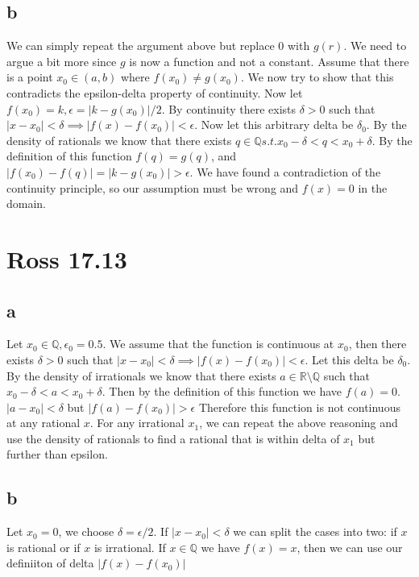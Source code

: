 \documentclass[12pt]{article}
\newcommand{\R}{\mathbb{R}}
\newcommand{\Q}{\mathbb{Q}}
\begin{document}
\subsection{b}
We can simply repeat the argument above but replace $0$ with $g(r)$. We need to argue a bit more since $g$ is now a function and not a constant.
\newline
Assume that there is a point $x_0 \in (a,b)$ where $f(x_0) \not= g(x_0)$. We now try to show that this contradicts the epsilon-delta property of continuity.
\newline
Now let $f(x_0) = k, \epsilon = |k-g(x_0)|/2$. By continuity there exists $\delta > 0$ such that $|x-x_0|<\delta \implies |f(x)-f(x_0)|<\epsilon$. Now let this arbitrary delta be $\delta_0$. By the density of rationals we know that there exists $q \in \Q s.t. x_0-\delta < q < x_0+\delta$. By the definition of this function $f(q)=g(q)$, and $|f(x_0)-f(q)|=|k-g(x_0)| > \epsilon$. \lightning
\newline
We have found a contradiction of the continuity principle, so our assumption must be wrong and $f(x) = 0$ in the domain.
\newpage


\section{Ross 17.13}

\subsection{a}
Let $x_0 \in \Q, \epsilon_0 = 0.5$. We assume that the function is continuous at $x_0$, then there exists $\delta > 0$ such that $|x-x_0|<\delta \implies |f(x)-f(x_0)|<\epsilon$. Let this delta be $\delta_0$. By the density of irrationals we know that there exists $a \in \R \setminus \Q$ such that $x_0-\delta < a < x_0+\delta$. Then by the definition of this function we have $f(a)=0$. $|a-x_0|<\delta$ but $|f(a)-f(x_0)|>\epsilon$ \lightning
\newline
Therefore this function is not continuous at any rational $x$.
\newline
For any irrational $x_1$, we can repeat the above reasoning and use the density of rationals to find a rational that is within delta of $x_1$ but further than epsilon.

\subsection{b}
Let $x_0 = 0$, we choose $\delta = \epsilon/2$. If $|x-x_0|<\delta$ we can split the cases into two: if $x$ is rational or if $x$ is irrational. If $x \in \Q$ we have $f(x) = x$, then we can use our definiiton of delta $|f(x)-f(x_0)|$
\end{document}
